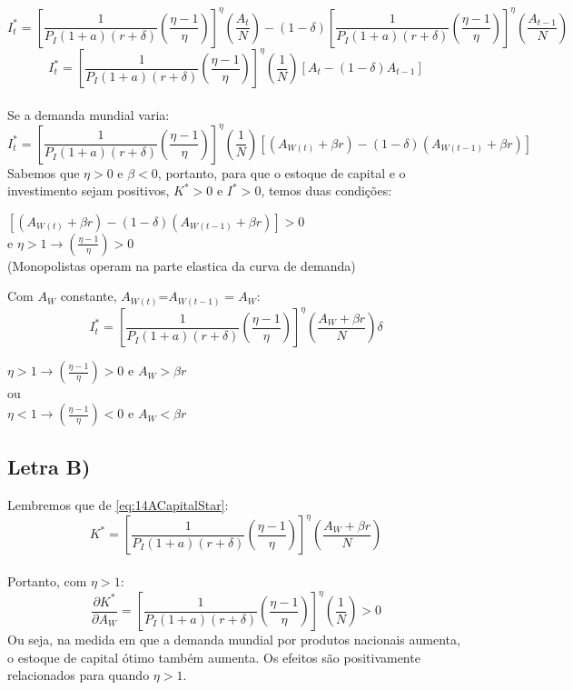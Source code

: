\documentclass{article}
\begin{document}
\begin{equation}
    I_t^* =\left[\frac{1}{P_I(1+a)(r+\delta)}\left(\frac{\eta-1}{\eta}\right)\right]^{\eta}\left(\frac{A_t}{N}\right) - (1-\delta)\left[\frac{1}{P_I(1+a)(r+\delta)}\left(\frac{\eta-1}{\eta}\right)\right]^{\eta}\left(\frac{A_{t-1}}{N}\right)
\end{equation}
\begin{equation}
    I_t^* =\left[\frac{1}{P_I(1+a)(r+\delta)}\left(\frac{\eta-1}{\eta}\right)\right]^{\eta}\left(\frac{1}{N}\right) \left[A_t -(1-\delta)A_{t-1}\right]
\end{equation}
\\
Se a demanda mundial varia:
\begin{equation}
    I_t^* =\left[\frac{1}{P_I(1+a)(r+\delta)}\left(\frac{\eta-1}{\eta}\right)\right]^{\eta}\left(\frac{1}{N}\right) \left[(A_{W(t)}+\beta r) -(1-\delta)(A_{W(t-1)}+\beta r)\right]
\end{equation}
Sabemos que $\eta>0$ e $\beta<0$, portanto, para que o estoque de capital e o investimento sejam positivos, $K^*>0$ e $I^*>0$, temos duas condições:
\begin{center}
    $\left[(A_{W(t)}+\beta r) -(1-\delta)(A_{W(t-1)}+\beta r)\right] > 0$
    \\ e $\eta>1 \to \left(\frac{\eta-1}{\eta}\right)>0$ \\
    (Monopolistas operam na parte elastica da curva de demanda)
\end{center}
Com $A_W$ constante, $A_{W(t)}$=$A_{W(t-1)}=A_W$:
\begin{equation}
    I_t^* =\left[\frac{1}{P_I(1+a)(r+\delta)}\left(\frac{\eta-1}{\eta}\right)\right]^{\eta}\left(\frac{A_W + \beta r}{N}\right)\delta
\end{equation}
\begin{center}
$\eta>1 \to \left(\frac{\eta-1}{\eta}\right)>0$ e $A_W > \beta r$
\\
ou
\\
$\eta<1 \to \left(\frac{\eta-1}{\eta}\right)<0$ e $A_W < \beta r$
\end{center}
\clearpage
\subsection*{Letra B)}
Lembremos que de \eqref{eq:14ACapitalStar}:
\begin{equation}
    K^*=\left[\frac{1}{P_I(1+a)(r+\delta)}\left(\frac{\eta-1}{\eta}\right)\right]^{\eta}\left(\frac{A_W+\beta r}{N}\right)
\end{equation}
\\ Portanto, com $\eta>1$:
\begin{equation}
    \frac{\partial K^*}{\partial A_W} = \left[\frac{1}{P_I(1+a)(r+\delta)}\left(\frac{\eta-1}{\eta}\right)\right]^{\eta}\left(\frac{1}{N}\right) > 0
\end{equation}
Ou seja, na medida em que a demanda mundial por produtos nacionais aumenta, o estoque de capital ótimo também aumenta. Os efeitos são positivamente relacionados para quando $\eta>1$.
\end{document}
